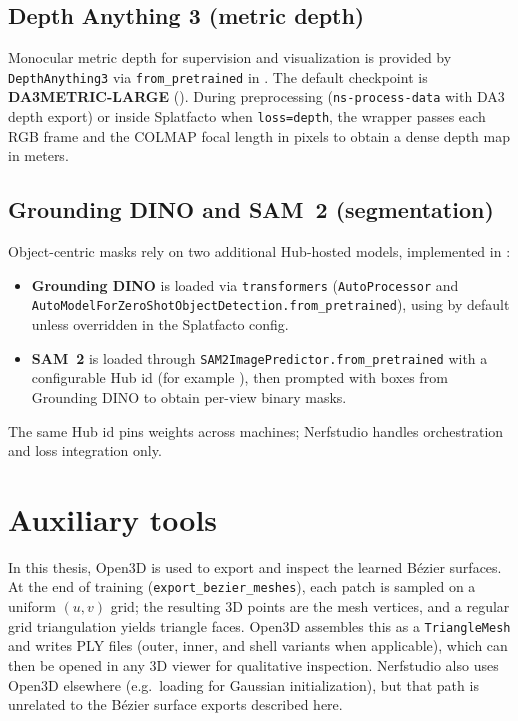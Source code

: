 \subsection{Depth Anything 3 (metric depth)}
Monocular metric depth for supervision and visualization is provided by \texttt{Depth\-Anything3} via \texttt{from\_pretrained} in . The default checkpoint is \textbf{DA3METRIC-LARGE} (). During preprocessing (\texttt{ns-process-data} with DA3 depth export) or inside Splatfacto when \texttt{loss=depth}, the wrapper passes each RGB frame and the COLMAP focal length in pixels to obtain a dense depth map in meters.

\subsection{Grounding DINO and SAM~2 (segmentation)}
Object-centric masks rely on two additional Hub-hosted models, implemented in :
\begin{itemize}
    \item \textbf{Grounding DINO} is loaded via \texttt{transformers} (\texttt{Auto\-Processor} and \texttt{Auto\-Model\-For\-Zero\-Shot\-Object\-Detection.from\_pretrained}), using  by default unless overridden in the Splatfacto config.
    \item \textbf{SAM~2} is loaded through \texttt{SAM2\-Image\-Predictor.from\_pretrained} with a configurable Hub id (for example ), then prompted with boxes from Grounding DINO to obtain per-view binary masks.
\end{itemize}
The same Hub id pins weights across machines; Nerfstudio handles orchestration and loss integration only.

\section{Auxiliary tools}

In this thesis, Open3D \cite{zhou2018open3d} is used to export and inspect the learned B\'ezier surfaces. At the end of training (\texttt{export\_bezier\_meshes}), each patch is sampled on a uniform $(u,v)$ grid; the resulting 3D points are the mesh vertices, and a regular grid triangulation yields triangle faces. Open3D assembles this as a \texttt{TriangleMesh} and writes PLY files (outer, inner, and shell variants when applicable), which can then be opened in any 3D viewer for qualitative inspection. Nerfstudio also uses Open3D elsewhere (e.g.\ loading  for Gaussian initialization), but that path is unrelated to the B\'ezier surface exports described here.

